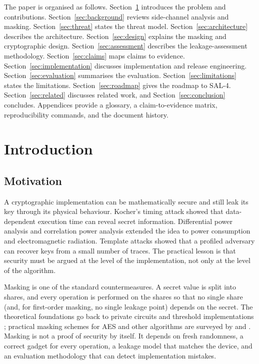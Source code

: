 \documentclass[11pt,a4paper]{article}
\theoremstyle{plain}
\theoremstyle{definition}
\theoremstyle{remark}
\begin{document}
The paper is organised as follows. Section~\ref{sec:intro} introduces the problem and
contributions. Section~\ref{sec:background} reviews side-channel analysis and masking.
Section~\ref{sec:threat} states the threat model. Section~\ref{sec:architecture}
describes the architecture. Section~\ref{sec:design} explains the masking and
cryptographic design. Section~\ref{sec:assessment} describes the leakage-assessment
methodology. Section~\ref{sec:claims} maps claims to evidence.
Section~\ref{sec:implementation} discusses implementation and release engineering.
Section~\ref{sec:evaluation} summarises the evaluation. Section~\ref{sec:limitations}
states the limitations. Section~\ref{sec:roadmap} gives the roadmap to SAL-4.
Section~\ref{sec:related} discusses related work, and Section~\ref{sec:conclusion}
concludes. Appendices provide a glossary, a claim-to-evidence matrix, reproducibility
commands, and the document history.

\section{Introduction}\label{sec:intro}

\subsection{Motivation}

A cryptographic implementation can be mathematically secure and still leak its key
through its physical behaviour. Kocher's timing attack \citep{kocher1996timing} showed
that data-dependent execution time can reveal secret information. Differential power
analysis \citep{kocher1999dpa} and correlation power analysis \citep{brier2004cpa}
extended the idea to power consumption and electromagnetic radiation. Template attacks
\citep{chari2002template} showed that a profiled adversary can recover keys from a small
number of traces. The practical lesson is that security must be argued at the level of
the implementation, not only at the level of the algorithm.

Masking is one of the standard countermeasures. A secret value is split into shares,
and every operation is performed on the shares so that no single share (and, for
first-order masking, no single leakage point) depends on the secret. The theoretical
foundations go back to private circuits \citep{ishai2003private} and threshold
implementations \citep{nikova2006threshold}; practical masking schemes for AES and other
algorithms are surveyed by \citet{mangard2007power} and \citet{rivain2010probing}.
Masking is not a proof of security by itself. It depends on fresh randomness, a correct
gadget for every operation, a leakage model that matches the device, and an evaluation
methodology that can detect implementation mistakes.
\end{document}
